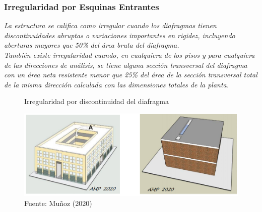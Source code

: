 \documentclass{article}%
\begin{document}
%


\begin{table}[ht!]%
\centering%
\caption{Irregularidad Torsional}%
%
\end{table}

%
\subsubsection{Irregularidad por Esquinas Entrantes}%
\label{ssubsec:IrregularidadporEsquinasEntrantes}%
\begin{tcolorbox}[colback=gray!5!white,colframe=cyan!75!black,fonttitle=\bfseries,title=Tabla N°9 E-030]%
\textit{La estructura se califica como irregular cuando los diafragmas tienen discontinuidades abruptas o variaciones importantes en rigidez, incluyendo aberturas mayores que 50\% del área bruta del diafragma.} \\ \textit{También  existe  irregularidad  cuando,  en  cualquiera de  los pisos y para cualquiera de las direcciones de análisis, se tiene alguna sección transversal del diafragma con un área neta resistente menor que 25\% del área de la sección transversal total de la misma dirección calculada con las dimensiones totales de la planta.}%
\end{tcolorbox}%


\begin{figure}[ht!]%
\centering%
\caption{Irregularidad por discontinuidad del diafragma}%
\includegraphics[scale=0.7]{i_diafragma.PNG}%
\caption*{\small Fuente: Muñoz (2020)}%
\end{figure}
\end{document}
